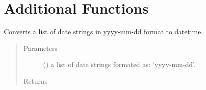 \documentclass[letterpaper,10pt,openany,oneside,english]{sphinxmanual}
\begin{document}
\section{Additional  Functions}
\label{\detokenize{additional_functions:additional-fredpy-functions}}\label{\detokenize{additional_functions::doc}}

\begin{fulllineitems}
\label{\detokenize{additional_functions:fredpy.date_times}}
Converts a list of date strings in yyyy-mm-dd format to datetime.
\begin{quote}\begin{description}
\item[{Parameters}] \leavevmode
{} () \textendash{} a list of date strings formated as: ‘yyyy-mm-dd’.

\item[{Returns}] \leavevmode
{}

\end{description}\end{quote}

\end{fulllineitems}

\end{document}

